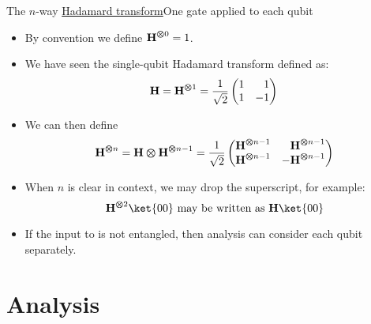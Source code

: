 \begin{frame}{The $n$-way \href{https://en.wikipedia.org/wiki/Hadamard_transform}{Hadamard transform}}{One \Hadamard{} gate applied to each qubit}

\begin{itemize}[<+->]
    \item By convention we define $\mbox{\bfseries{\textrm{H}}}^{\bm{\otimes} 0}=1$.
    \item We have seen the single-qubit Hadamard transform \Hadamard{} defined as:
    \[
        \Hadamard = \TensSupProd{\Hadamard}{1} = \HMatrix{}
    \]
    \item We can then define
    \Vskip{-1.5em}\[  \TensSupProd{\Hadamard}{n} = \TensProd{\Hadamard}{\TensSupProd{\Hadamard}{n-1}} = \SQBG{\RootTwo}{\TensSupProd{\Hadamard}{n-1}}{\TensSupProd{\Hadamard}{n-1}}{\TensSupProd{\Hadamard}{n-1}}{-\TensSupProd{\Hadamard}{n-1}}
    \]
    \item When $n$ is clear in context, we may drop the superscript, for example:
    \[
       \TensSupProd{\Hadamard}{2} \ket{00} \mbox{ may be written as }
       \Hadamard \ket{00}
    \]
    \item If the input to  is not entangled, then analysis can consider each qubit separately.
\end{itemize}
    
\end{frame}

\section*{Analysis}

